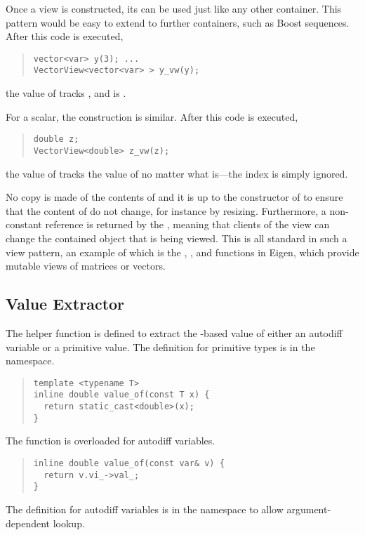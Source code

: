 \documentclass[10pt]{article}
\begin{document}
Once a view is constructed, its  can be used just
like any other container.   This pattern would be easy to extend to
further containers, such as Boost sequences.  After this code is
executed, 
%
\begin{quote}
\begin{Verbatim}
vector<var> y(3); ...
VectorView<vector<var> > y_vw(y);
\end{Verbatim}
\end{quote}
%
the value of  tracks , and
 is .  

For a scalar, the construction is similar.  After this code is
executed,
%
\begin{quote}
\begin{Verbatim}
double z;
VectorView<double> z_vw(z);
\end{Verbatim}
\end{quote}
%
the value of  tracks the value of  no matter
what  is---the index is simply ignored.  

No copy is made of the contents of  and it is up to the
constructor of  to ensure that the content of
 do not change, for instance by resizing.  Furthermore, a
non-constant reference is returned by the , meaning
that clients of the view can change the contained object that is being
viewed.  This is all standard in such a view pattern, an example of
which is the , , and  functions in
Eigen, which provide mutable views of matrices or vectors.

\subsection{Value Extractor}

The helper function  is defined to extract the
-based value of either an autodiff variable or a
primitive value.  The definition for primitive types is in the
 namespace.
%
\begin{quote}
\begin{Verbatim}
template <typename T>
inline double value_of(const T x) {
  return static_cast<double>(x);
}
\end{Verbatim}
\end{quote}
%
The function is overloaded for autodiff variables.
%
\begin{quote}
\begin{Verbatim}
inline double value_of(const var& v) {
  return v.vi_->val_;
}
\end{Verbatim}
\end{quote}
%
The definition for autodiff variables is in the 
namespace to allow argument-dependent lookup.
\end{document}
